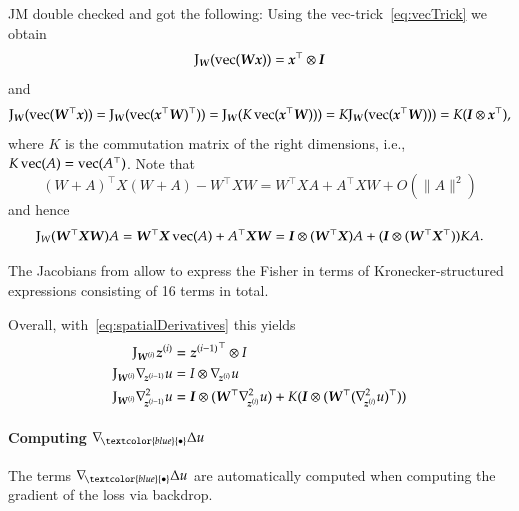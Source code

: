 JM double checked and got the following:
Using the vec-trick~\eqref{eq:vecTrick} we obtain 
\[  \jac_{\mW}(\flatten(\mW \vx)) = \vx^\top\otimes \mI \]
and 
\[ \jac_\mW(\flatten(\mW^\top \vx)) = \jac_\mW(\flatten(\vx^\top\mW)^\top)) = \jac_\mW(K\flatten(\vx^\top\mW))) = K\jac_\mW(\flatten(\vx^\top\mW))) = K (\mI\otimes \vx^\top),  \]
where $K$ is the commutation matrix of the right dimensions, i.e., $K\flatten(A) = \flatten(A^\top)$. 
Note that 
\[ (W+A)^\top X (W+A) - W^\top X W = W^\top X A + A^\top X W + O(\lVert A \rVert^2) \]
and hence 
\[ \jac_W(\mW^\top \mX \mW)A = \mW^\top \mX \flatten(A) + A^\top \mX \mW = \mI \otimes (\mW^{\top}\mX) A + (\mI \otimes (\mW^{\top}\mX^{\top})) K A. \]

The Jacobians from  allow to express the Fisher in
terms of Kronecker-structured expressions consisting of 16 terms in total.


Overall, with~\eqref{eq:spatialDerivatives} this yields 
\begin{align}
  \begin{split}
    \jac_{\mW^{(i)}}\vz^{(i)}
    &=
      {\vz^{(i-1)}}^\top\otimes I
    \\
    \jac_{\mW^{(i)}}\grad{\vz^{(i-1)}}u
    &=
      I\otimes 
      \grad{\vz^{(i)}}u
    \\
    \jac_{\mW^{(i)}}\gradsquared{\vz^{(i-1)}}u
    &=
    \mI \otimes (\mW^{\top}\gradsquared{\vz^{(i)}}u) + K (\mI \otimes (\mW^{\top}(\gradsquared{\vz^{(i)}}u)^{\top}))
  \end{split}
\end{align}


\paragraph{Computing $\grad{\textcolor{blue}{\bullet}}\Delta u$}
The terms $\grad{\textcolor{blue}{\bullet}}\Delta u$ are automatically computed when computing the gradient of the loss via backdrop. 

